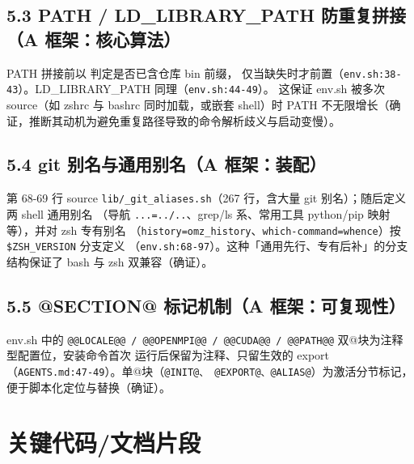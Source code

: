 \documentclass[UTF8]{ctexart}
\begin{document}
\subsection{5.3 PATH / LD\_LIBRARY\_PATH 防重复拼接（A 框架：核心算法）}
PATH 拼接前以 \texttt{} 判定是否已含仓库 bin 前缀，
仅当缺失时才前置（\texttt{\nolinkurl{env.sh:38-43}}）。LD\_LIBRARY\_PATH 同理（\texttt{\nolinkurl{env.sh:44-49}}）。
这保证 env.sh 被多次 source（如 zshrc 与 bashrc 同时加载，或嵌套 shell）时 PATH 不无限增长（确证，推断其动机为避免重复路径导致的命令解析歧义与启动变慢）。


\subsection{5.4 git 别名与通用别名（A 框架：装配）}
第 68-69 行 source \texttt{lib/\_git\_aliases.sh}（267 行，含大量 git 别名）；随后定义两 shell 通用别名
（导航 \texttt{...=../..}、grep/ls 系、常用工具 python/pip 映射等），并对 zsh 专有别名
（\texttt{history=omz\_history}、\texttt{which-command=whence}）按 \texttt{\$ZSH\_VERSION} 分支定义
（\texttt{\nolinkurl{env.sh:68-97}}）。这种「通用先行、专有后补」的分支结构保证了 bash 与 zsh 双兼容（确证）。


\subsection{5.5 @SECTION@ 标记机制（A 框架：可复现性）}
env.sh 中的 \texttt{@@LOCALE@@ / @@OPENMPI@@ / @@CUDA@@ / @@PATH@@} 双@块为注释型配置位，安装命令首次
运行后保留为注释、只留生效的 export（\texttt{\nolinkurl{AGENTS.md:47-49}}）。单@块（\texttt{@INIT@、
@EXPORT@、@ALIAS@}）为激活分节标记，便于脚本化定位与替换（确证）。


\section{关键代码/文档片段}




\end{document}
